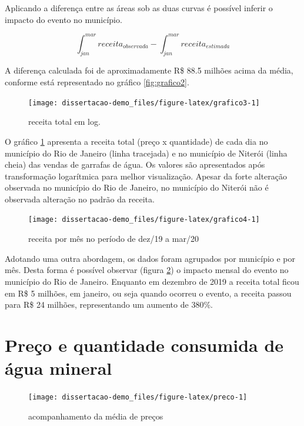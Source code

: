 \documentclass[
  12pt,
]{book}
\begin{document}
Aplicando a diferença entre as áreas sob as duas curvas é possível inferir o impacto do evento no município.

\[\int_{jan}^{mar} receita_{observada} - \int_{jan}^{mar} receita_{estimada}\]

A diferença calculada foi de aproximadamente R\$ 88.5 milhões acima da média, conforme está representado no gráfico \ref{fig:grafico2}.

\begin{figure}

{\centering \texttt{[image: dissertacao-demo\_files/figure-latex/grafico3-1]} 

}

\caption{receita total em log.}\label{fig:grafico3}
\end{figure}

O gráfico \ref{fig:grafico3} apresenta a receita total (preço x quantidade) de cada dia no município do Rio de Janeiro (linha tracejada) e no município de Niterói (linha cheia) das vendas de garrafas de água. Os valores são apresentados após transformação logarítmica para melhor visualização. Apesar da forte alteração observada no município do Rio de Janeiro, no município do Niterói não é observada alteração no padrão da receita.

\begin{figure}

{\centering \texttt{[image: dissertacao-demo\_files/figure-latex/grafico4-1]} 

}

\caption{receita por mês no período de dez/19 a mar/20}\label{fig:grafico4}
\end{figure}

Adotando uma outra abordagem, os dados foram agrupados por município e por mês. Desta forma é possível observar (figura \ref{fig:grafico4}) o impacto mensal do evento no município do Rio de Janeiro. Enquanto em dezembro de 2019 a receita total ficou em R\$ 5 milhões, em janeiro, ou seja quando ocorreu o evento, a receita passou para R\$ 24 milhões, representando um aumento de 380\%.

\hypertarget{preuxe7o-e-quantidade-consumida-de-uxe1gua-mineral}{%
\section{Preço e quantidade consumida de água mineral}\label{preuxe7o-e-quantidade-consumida-de-uxe1gua-mineral}}

\begin{figure}

{\centering \texttt{[image: dissertacao-demo\_files/figure-latex/preco-1]} 

}

\caption{acompanhamento da média de preços}\label{fig:preco}
\end{figure}
\end{document}
